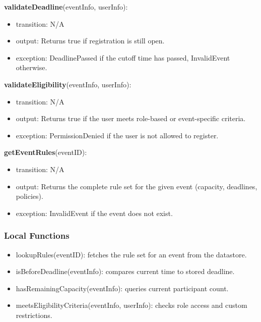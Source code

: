 \documentclass[12pt, titlepage]{article}
\begin{document}
\noindent \textbf{validateDeadline}(eventInfo, userInfo):

\begin{itemize}
    \item transition: N/A
    \item output: Returns true if registration is still open.
    \item exception: DeadlinePassed if the cutoff time has passed, InvalidEvent otherwise.
\end{itemize}

\vspace{0.15cm}

\noindent \textbf{validateEligibility}(eventInfo, userInfo):

\begin{itemize}
    \item transition: N/A
    \item output: Returns true if the user meets role-based or event-specific criteria.
    \item exception: PermissionDenied if the user is not allowed to register.
\end{itemize}

\vspace{0.15cm}

\noindent \textbf{getEventRules}(eventID):

\begin{itemize}
    \item transition: N/A
    \item output: Returns the complete rule set for the given event (capacity, deadlines, policies).
    \item exception: InvalidEvent if the event does not exist.
\end{itemize}

\subsubsection{Local Functions}

\begin{itemize}
    \item lookupRules(eventID): fetches the rule set for an event from the datastore.
    \item isBeforeDeadline(eventInfo): compares current time to stored deadline.
    \item hasRemainingCapacity(eventInfo): queries current participant count.
    \item meetsEligibilityCriteria(eventInfo, userInfo): checks role access and custom restrictions.
\end{itemize}
\end{document}
